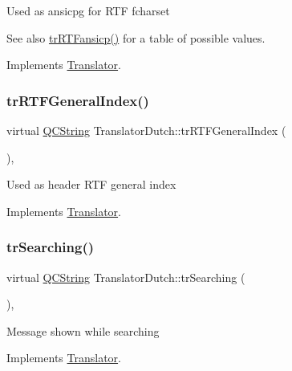 Used as ansicpg for R\+TF fcharset \begin{DoxySeeAlso}{See also}
\mbox{\hyperlink{class_translator_dutch_ae0b6e77d800b7a57e9b17f689fb81771}{tr\+R\+T\+Fansicp()}} for a table of possible values. 
\end{DoxySeeAlso}


Implements \mbox{\hyperlink{class_translator_afad391f3cbfb5ce6332b7239f8e2049a}{Translator}}.

\mbox{\label{class_translator_dutch_ad8f9b957281e4b46e08c110c200ebaf2}} 
\subsubsection{\texorpdfstring{trRTFGeneralIndex()}{trRTFGeneralIndex()}}
{\footnotesize\ttfamily virtual \mbox{\hyperlink{class_q_c_string}{Q\+C\+String}} Translator\+Dutch\+::tr\+R\+T\+F\+General\+Index (\begin{DoxyParamCaption}{ }\end{DoxyParamCaption})\hspace{0.3cm}{\ttfamily [inline]}, {\ttfamily [virtual]}}

Used as header R\+TF general index 

Implements \mbox{\hyperlink{class_translator}{Translator}}.

\mbox{\label{class_translator_dutch_aefc546c44e62a94715e808485573a565}} 
\subsubsection{\texorpdfstring{trSearching()}{trSearching()}}
{\footnotesize\ttfamily virtual \mbox{\hyperlink{class_q_c_string}{Q\+C\+String}} Translator\+Dutch\+::tr\+Searching (\begin{DoxyParamCaption}{ }\end{DoxyParamCaption})\hspace{0.3cm}{\ttfamily [inline]}, {\ttfamily [virtual]}}

Message shown while searching 

Implements \mbox{\hyperlink{class_translator}{Translator}}.

